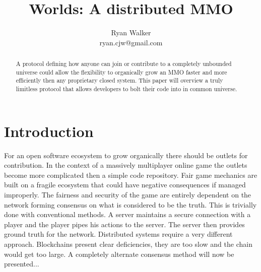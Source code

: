\documentclass[runningheads,a4paper]{llncs}
\begin{document}
\def \SystemName {Worlds} %

\mainmatter  %

\title{\SystemName: A distributed MMO}

\author{Ryan Walker\\
				ryan.cjw@gmail.com}

\institute{} %

\maketitle


%  

\begin{abstract}
A protocol defining how anyone can join or contribute to a completely unbounded universe could allow the flexibility to organically grow an MMO faster and more efficiently then any proprietary closed system. This paper will overview a truly limitless protocol that allows developers to bolt their code into in common universe. 
\end{abstract}

\section{Introduction}
For an open software ecosystem to grow organically there should be outlets for contribution. In the context of a massively multiplayer online game the outlets become more complicated then a simple code repository. Fair game mechanics are built on a fragile ecosystem that could have negative consequences if managed improperly. The fairness and security of the game are entirely dependent on the network forming consensus on what is considered to be the truth. This is trivially done with conventional methods. A server maintains a secure connection with a player and the player pipes his actions to the server. The server then provides ground truth for the network. Distributed systems require a very different approach. Blockchains present clear deficiencies, they are too slow and the chain would get too large. A completely alternate consensus method will now be presented...
\end{document}
